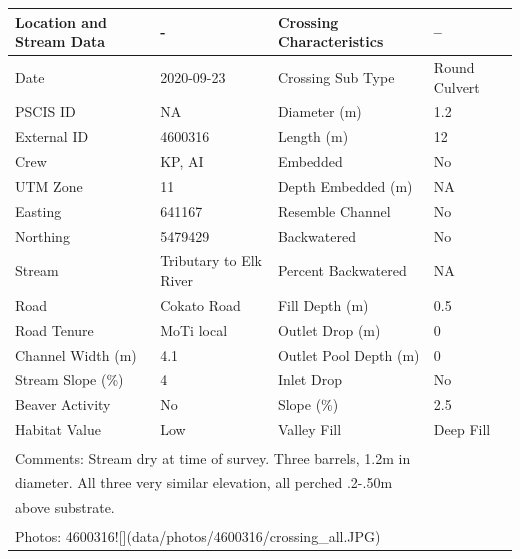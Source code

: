 \documentclass[
]{book}
\begin{document}
\begin{tabular}{llll}
\toprule
Location and Stream Data & - & Crossing Characteristics & --\\
\midrule
Date & 2020-09-23 & Crossing Sub Type & Round Culvert\\
PSCIS ID & NA & Diameter (m) & 1.2\\
External ID & 4600316 & Length (m) & 12\\
Crew & KP, AI & Embedded & No\\
UTM Zone & 11 & Depth Embedded (m) & NA\\
\addlinespace
Easting & 641167 & Resemble Channel & No\\
Northing & 5479429 & Backwatered & No\\
Stream & Tributary to Elk River & Percent Backwatered & NA\\
Road & Cokato Road & Fill Depth (m) & 0.5\\
Road Tenure & MoTi local & Outlet Drop (m) & 0\\
\addlinespace
Channel Width (m) & 4.1 & Outlet Pool Depth (m) & 0\\
Stream Slope (\%) & 4 & Inlet Drop & No\\
Beaver Activity & No & Slope (\%) & 2.5\\
Habitat Value & Low & Valley Fill & Deep Fill\\
\bottomrule
\multicolumn{4}{l}{\textsuperscript{} Comments: Stream dry at time of survey. Three barrels, 1.2m in}\\
\multicolumn{4}{l}{diameter. All three very similar elevation, all perched .2-.50m}\\
\multicolumn{4}{l}{above substrate.}\\
\multicolumn{4}{l}{\textsuperscript{} Photos: 4600316![](data/photos/4600316/crossing\_all.JPG)}\\
\end{tabular}
\end{document}
